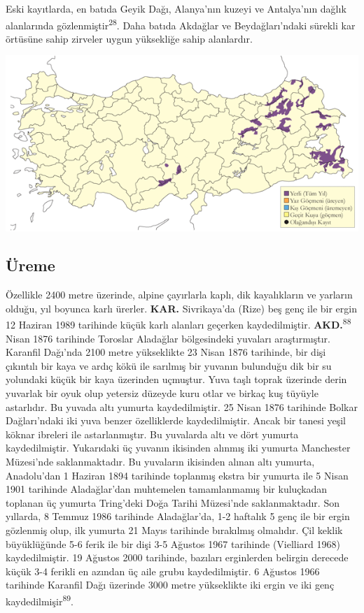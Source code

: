 \documentclass[
  letterpaper,
  DIV=11,
  numbers=noendperiod]{scrreprt}
\begin{document}
Eski kayıtlarda, en batıda Geyik Dağı, Alanya'nın kuzeyi ve Antalya'nın
dağlık alanlarında gözlenmiştir\textsuperscript{28}. Daha batıda
Akdağlar ve Beydağları'ndaki sürekli kar örtüsüne sahip zirveler uygun
yüksekliğe sahip alanlardır.

\includegraphics{images/harita_Page_038.png}

\hypertarget{uxfcreme-37}{%
\subsection{\texorpdfstring{\textbf{Üreme}}{Üreme}}\label{uxfcreme-37}}

Özellikle 2400 metre üzerinde, alpine çayırlarla kaplı, dik kayalıkların
ve yarların olduğu, yıl boyunca karlı ürerler. \textbf{KAR.}
Sivrikaya'da (Rize) beş genç ile bir ergin 12 Haziran 1989 tarihinde
küçük karlı alanları geçerken kaydedilmiştir.
\textbf{AKD.}\textsuperscript{88} Nisan 1876 tarihinde Toroslar
Aladağlar bölgesindeki yuvaları araştırmıştır. Karanfil Dağı'nda 2100
metre yükseklikte 23 Nisan 1876 tarihinde, bir dişi çıkıntılı bir kaya
ve ardıç kökü ile sarılmış bir yuvanın bulunduğu dik bir su yolundaki
küçük bir kaya üzerinden uçmuştur. Yuva taşlı toprak üzerinde derin
yuvarlak bir oyuk olup yetersiz düzeyde kuru otlar ve birkaç kuş tüyüyle
astarlıdır. Bu yuvada altı yumurta kaydedilmiştir. 25 Nisan 1876
tarihinde Bolkar Dağları'ndaki iki yuva benzer özelliklerde
kaydedilmiştir. Ancak bir tanesi yeşil köknar ibreleri ile
astarlanmıştır. Bu yuvalarda altı ve dört yumurta kaydedilmiştir.
Yukarıdaki üç yuvanın ikisinden alınmış iki yumurta Manchester
Müzesi'nde saklanmaktadır. Bu yuvaların ikisinden alınan altı yumurta,
Anadolu'dan 1 Haziran 1894 tarihinde toplanmış ekstra bir yumurta ile 5
Nisan 1901 tarihinde Aladağlar'dan muhtemelen tamamlanmamış bir
kuluçkadan toplanan üç yumurta Tring'deki Doğa Tarihi Müzesi'nde
saklanmaktadır. Son yıllarda, 8 Temmuz 1986 tarihinde Aladağlar'da, 1-2
haftalık 5 genç ile bir ergin gözlenmiş olup, ilk yumurta 21 Mayıs
tarihinde bırakılmış olmalıdır. Çil keklik büyüklüğünde 5-6 ferik ile
bir dişi 3-5 Ağustos 1967 tarihinde (Vielliard 1968) kaydedilmiştir. 19
Ağustos 2000 tarihinde, bazıları erginlerden belirgin derecede küçük 3-4
ferikli en azından üç aile grubu kaydedilmiştir. 6 Ağustos 1966
tarihinde Karanfil Dağı üzerinde 3000 metre yükseklikte iki ergin ve iki
genç kaydedilmişir\textsuperscript{89}.
\end{document}
